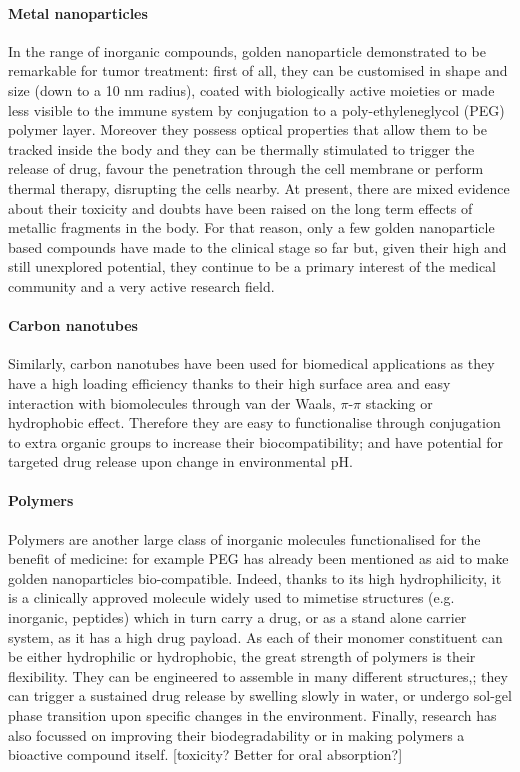 \documentclass[a4paper,11pt]{extreport}
\begin{document}
\paragraph{Metal nanoparticles} In the range of inorganic compounds, golden nanoparticle demonstrated to be remarkable for tumor treatment: first of all, they can be customised in shape and size (down to a 10 nm radius), coated with biologically active moieties or made less visible to the immune system by conjugation to a poly-ethyleneglycol (PEG) polymer layer.\cite{Singh2018} Moreover they possess optical properties that allow them to be tracked inside the body and they can be thermally stimulated to trigger the release of drug, favour the penetration through the cell membrane or perform thermal therapy, disrupting the cells nearby.\cite{Boisselier2009} At present, there are mixed evidence about their toxicity\cite{Boisselier2009} and doubts have been raised on the long term effects of metallic fragments in the body. For that reason, only a few golden nanoparticle based compounds have made to the clinical stage so far\cite{Singh2018} but, given their high and still unexplored potential, they continue to be a primary interest of the medical community and a very active research field.

\paragraph{Carbon nanotubes}
Similarly, carbon nanotubes have been used for biomedical applications as they have a high loading efficiency thanks to their high surface area and easy interaction with biomolecules through van der Waals, $\pi$-$\pi$ stacking or hydrophobic effect.\cite{Erol2017} Therefore they are easy to functionalise through conjugation to extra organic groups to increase their biocompatibility; and have potential for targeted drug release upon change in environmental pH.\cite{Depan2011}

\paragraph{Polymers} Polymers are another large class of inorganic molecules functionalised for the benefit of medicine: for example PEG has already been mentioned as aid to make golden nanoparticles bio-compatible. Indeed, thanks to its high hydrophilicity, it is a clinically approved molecule widely used to mimetise structures (e.g. inorganic, peptides) which in turn carry a drug,\cite{Lammers2009} or as a stand alone carrier system, as it has a high drug payload.\cite{Liechty2010} As each of their monomer constituent can be either hydrophilic or hydrophobic, the great strength of polymers is their flexibility. They can be engineered to assemble in many different structures,\cite{Kawakatsu2004}; they can trigger a sustained drug release by swelling slowly in water,\cite{Nicolas2013} or undergo sol-gel phase transition upon specific changes in the environment.\cite{Liechty2010} Finally, research has also focussed on improving their biodegradability\cite{Nair2007} or in making polymers a bioactive compound itself.\cite{Rao2018} [toxicity? Better for oral absorption?]
\end{document}
